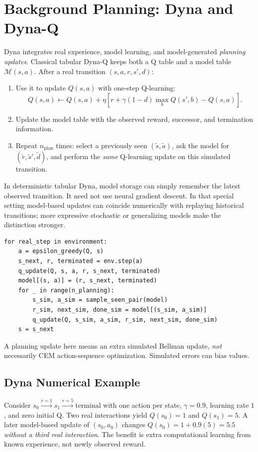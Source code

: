 \section{Background Planning: Dyna and Dyna-Q}
Dyna integrates real experience, model learning, and model-generated \emph{planning updates}. Classical tabular Dyna-Q keeps both a Q table and a model table $\mathcal M(s,a)$.
After a real transition $(s,a,r,s',d)$:
\begin{enumerate}
\item Use it to update $Q(s,a)$ with one-step Q-learning:
\begin{equation}
Q(s,a)\leftarrow Q(s,a)+\eta
[r+\gamma(1-d)\max_bQ(s',b)-Q(s,a)].
\end{equation}
\item Update the model table with the observed reward, successor, and termination information.
\item Repeat $n_{\mathrm{plan}}$ times: select a previously seen $(\tilde s,\tilde a)$, ask the model for $(\tilde r,\tilde s',\tilde d)$, and perform the \emph{same} Q-learning update on this simulated transition.
\end{enumerate}
In deterministic tabular Dyna, model storage can simply remember the latest observed transition. It need not use neural gradient descent. In that special setting model-based updates can coincide numerically with replaying historical transitions; more expressive stochastic or generalizing models make the distinction stronger.
\begin{verbatim}
for real_step in environment:
    a = epsilon_greedy(Q, s)
    s_next, r, terminated = env.step(a)
    q_update(Q, s, a, r, s_next, terminated)
    model[(s, a)] = (r, s_next, terminated)
    for _ in range(n_planning):
        s_sim, a_sim = sample_seen_pair(model)
        r_sim, next_sim, done_sim = model[(s_sim, a_sim)]
        q_update(Q, s_sim, a_sim, r_sim, next_sim, done_sim)
    s = s_next
\end{verbatim}
A planning update here means an extra simulated Bellman update, \emph{not} necessarily CEM action-sequence optimization. Simulated errors can bias values.

\subsection{Dyna Numerical Example}
Consider $s_0\xrightarrow{r=1}s_1\xrightarrow{r=5}\mathrm{terminal}$ with one action per state, $\gamma=0.9$, learning rate $1$, and zero initial Q. Two real interactions yield $Q(s_0)=1$ and $Q(s_1)=5$. A later model-based update of $(s_0,a_0)$ changes $Q(s_0)=1+0.9(5)=5.5$ \emph{without a third real interaction}. The benefit is extra computational learning from known experience, not newly observed reward.

